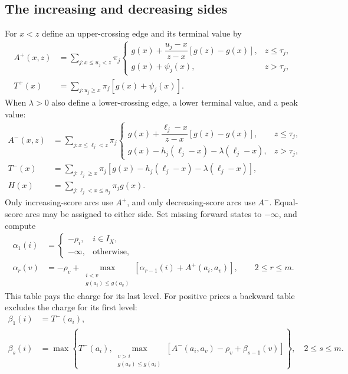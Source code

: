 \subsection{The increasing and decreasing sides}
For $x<z$ define an upper-crossing edge and its terminal value by
\begin{align}
 A^+(x,z)&=\sum_{j:x\leq u_j<z}\pi_j
 \begin{cases}
 g(x)+\dfrac{u_j-x}{z-x}[g(z)-g(x)],&z\leq\tau_j,\\
 g(x)+\psi_j(x),&z>\tau_j,
 \end{cases}\label{eq:r46-plus}\\
 T^+(x)&=\sum_{j:u_j\geq x}\pi_j[g(x)+\psi_j(x)].\label{eq:r46-plus-tail}
\end{align}
When $\lambda>0$ also define a lower-crossing edge, a lower terminal value, and a peak value:
\begin{align}
 A^-(x,z)&=\sum_{j:x\leq\ell_j<z}\pi_j
 \begin{cases}
 g(x)+\dfrac{\ell_j-x}{z-x}[g(z)-g(x)],&z\leq\tau_j,\\
 g(x)-h_j(\ell_j-x)-\lambda(\ell_j-x),&z>\tau_j,
 \end{cases}\label{eq:r46-minus}\\
 T^-(x)&=\sum_{j:\ell_j\geq x}\pi_j
          [g(x)-h_j(\ell_j-x)-\lambda(\ell_j-x)],\label{eq:r46-minus-tail}\\
 H(x)&=\sum_{j:\ell_j<x\leq u_j}\pi_jg(x).\label{eq:r46-peak}
\end{align}
Only increasing-score arcs use $A^+$, and only decreasing-score arcs use $A^-$. Equal-score arcs may be assigned to either side. Set missing forward states to $-\infty$, and compute
\begin{align}
 \alpha_1(i)&=\begin{cases}-\rho_i,&i\in I_X,\\-\infty,&\text{otherwise},\end{cases}\label{eq:r46-forward}\\
 \alpha_r(v)&=-\rho_v+
    \max_{\substack{i<v\\g(a_i)\leq g(a_v)}}
       [\alpha_{r-1}(i)+A^+(a_i,a_v)],\qquad 2\leq r\leq m.\nonumber
\end{align}
This table pays the charge for its last level. For positive prices a backward table excludes the charge for its first level:
\begin{align}
 \beta_1(i)&=T^-(a_i),\label{eq:r46-backward}\\
 \beta_s(i)&=\max\left\{T^-(a_i),
  \max_{\substack{v>i\\g(a_v)\leq g(a_i)}}
       [A^-(a_i,a_v)-\rho_v+\beta_{s-1}(v)]\right\},\quad 2\leq s\leq m.\nonumber
\end{align}

